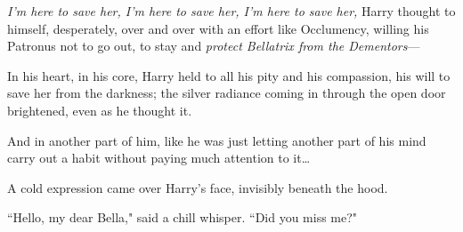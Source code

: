 \emph{I'm here to save her, I'm here to save her, I'm here to save her,} Harry thought to himself, desperately, over and over with an effort like Occlumency, willing his Patronus not to go out, to stay and \emph{protect Bellatrix from the Dementors}—

In his heart, in his core, Harry held to all his pity and his compassion, his will to save her from the darkness; the silver radiance coming in through the open door brightened, even as he thought it.

And in another part of him, like he was just letting another part of his mind carry out a habit without paying much attention to it{\ldots}

A cold expression came over Harry's face, invisibly beneath the hood.

``Hello, my dear Bella," said a chill whisper. ``Did you miss me?"

